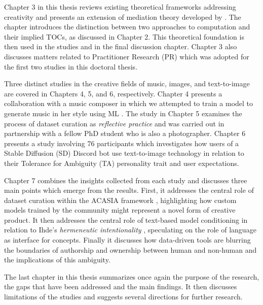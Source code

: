 Chapter 3 in this thesis reviews existing theoretical frameworks addressing creativity \citep{Rhodes1961,Boden2003,Hoorn2014} and presents an extension of mediation theory developed by \cite{Ihde1990,Ihde1993}. The chapter introduces the distinction between two approaches to computation and their implied TOCs, as discussed in Chapter 2. This theoretical foundation is then used in the studies and in the final discussion chapter. Chapter 3 also discusses matters related to Practitioner Research (PR) which was adopted for the first two studies in this doctoral thesis.

Three distinct studies in the creative fields of music, images, and text-to-image are covered in Chapters 4, 5, and 6, respectively. Chapter 4 presents a collaboration with a music composer in which we attempted to train a model to generate music in her style using ML \citep{Dinculescu2019,Huang2018}. The study in Chapter 5 examines the process of dataset curation as \emph{reflective practice} \citep{Schoen1991} and was carried out in partnership with a fellow PhD student who is also a photographer. Chapter 6 presents a study involving 76 participants which investigates how users of a Stable Diffusion (SD) Discord bot use text-to-image technology in relation to their Tolerance for Ambiguity (TA) personality trait \citep{Herman2010,Norton1975,Furnham2013,ZENASNI2008} and user expectations.

Chapter 7 combines the insights collected from each study and discusses three main points which emerge from the results. First, it addresses the central role of dataset curation within the ACASIA framework \citep{Hoorn2023}, highlighting how custom models trained by the community might represent a novel form of creative product. It then addresses the central role of text-based model conditioning in relation to Ihde's \emph{hermeneutic intentionality} \citep{Ihde1993}, speculating on the role of language as interface for concepts. Finally it discusses how data-driven tools are blurring the boundaries of authorship and ownership between human and non-human and the implications of this ambiguity.

The last chapter in this thesis summarizes once again the purpose of the research, the gaps that have been addressed and the main findings. It then discusses limitations of the studies and suggests several directions for further research.






